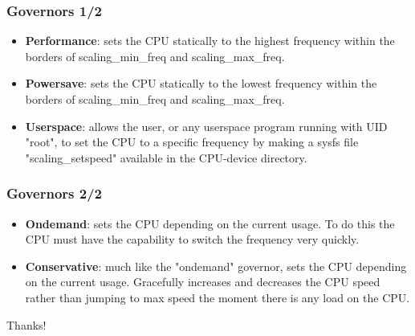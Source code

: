 \documentclass{beamer}
\begin{document}
\begin{frame}
\frametitle{Governors 1/2}
\begin{itemize}
\item \textbf{Performance}: sets the CPU statically to the
highest frequency within the borders of scaling\_min\_freq and
scaling\_max\_freq.

\item \textbf{Powersave}: sets the CPU statically to the
lowest frequency within the borders of scaling\_min\_freq and
scaling\_max\_freq.

\item \textbf{Userspace}: allows the user, or any userspace
program running with UID "root", to set the CPU to a specific frequency
by making a sysfs file "scaling\_setspeed" available in the CPU-device
directory.

\end{itemize}
\end{frame}

\begin{frame}
\frametitle{Governors 2/2}
\begin{itemize}

\item \textbf{Ondemand}: sets the CPU depending on the
current usage. To do this the CPU must have the capability to
switch the frequency very quickly.

\item \textbf{Conservative}:  much like the "ondemand" governor, sets the CPU depending on the current usage. Gracefully increases and decreases the CPU speed
rather than jumping to max speed the moment there is any load on the
CPU. 
\end{itemize}
\end{frame}


\begin{frame}
\Huge{\centerline{Thanks!}}
\end{frame}
\end{document}
